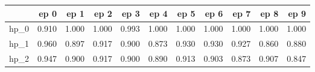 \begin{tabular}{lrrrrrrrrrr}
\toprule
{} &   ep 0 &   ep 1 &   ep 2 &   ep 3 &   ep 4 &   ep 5 &   ep 6 &   ep 7 &   ep 8 &   ep 9 \\
\midrule
hp\_0 &  0.910 &  1.000 &  1.000 &  0.993 &  1.000 &  1.000 &  1.000 &  1.000 &  1.000 &  1.000 \\
hp\_1 &  0.960 &  0.897 &  0.917 &  0.900 &  0.873 &  0.930 &  0.930 &  0.927 &  0.860 &  0.880 \\
hp\_2 &  0.947 &  0.900 &  0.917 &  0.900 &  0.890 &  0.913 &  0.903 &  0.873 &  0.907 &  0.847 \\
\bottomrule
\end{tabular}
